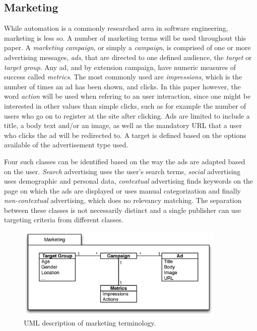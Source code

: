 \documentclass[10pt,twocolumn]{article}
\begin{document}
\subsection{Marketing}
While automation is a commonly researched area in software engineering, marketing is less so. A number of marketing terms will be used throughout this paper. A \emph{marketing campaign}, or simply a \emph{campaign}, is comprised of one or more advertising messages, \emph{ads}, that are directed to one defined audience, the \emph{target} or \emph{target group}. Any ad, and by extension campaign, have numeric measures of success called \emph{metrics}. The most commonly used are \emph{impressions}, which is the number of times an ad has been shown, and clicks. In this paper however, the word \emph{action} will be used when refering to an user interaction, since one might be interested in other values than simple clicks, such as for example the number of users who go on to register at the site after clicking. Ads are limited to include a title, a body text and/or an image, as well as the mandatory URL that a user who clicks the ad will be redirected to. A target is defined based on the options available of the advertisement type used.

Four such classes can be identified based on the way the ads are adapted based on the user. \emph{Search} advertising uses the user's search terms, \emph{social} advertising uses demographic and personal data, \emph{contextual} advertising finds keywords on the page on which the ads are displayed or uses manual categorization and finally \emph{non-contextual} advertising, which does no relevancy matching. The separation between these classes is not necessarily distinct and a single publisher can use targeting criteria from different classes.

\begin{figure}[htb] \centering \includegraphics[width=0.9\textwidth]{marketing-uml.eps}
	\caption{UML description of marketing terminology.}
	\label{fig:MarketingTerminology}
\end{figure}
\end{document}
